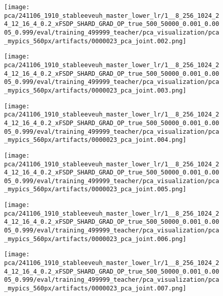 \begin{figure*}[p]
\begin{subfigure}[t]{0.097\textwidth}
    \end{subfigure}\hfill
    \begin{subfigure}[t]{0.097\textwidth}
        \centering
        \texttt{[image: pca/241106\_1910\_stableeveuh\_master\_lower\_lr/1\_\_8\_256\_1024\_24\_12\_16\_4\_0.2\_xFSDP\_SHARD\_GRAD\_OP\_true\_500\_50000\_0.001\_0.0005\_0.999/eval/training\_499999\_teacher/pca\_visualization/pca\_mypics\_560px/artifacts/0000023\_pca\_joint.002.png]}
    \end{subfigure}\hfill
    \begin{subfigure}[t]{0.097\textwidth}
        \centering
        \texttt{[image: pca/241106\_1910\_stableeveuh\_master\_lower\_lr/1\_\_8\_256\_1024\_24\_12\_16\_4\_0.2\_xFSDP\_SHARD\_GRAD\_OP\_true\_500\_50000\_0.001\_0.0005\_0.999/eval/training\_499999\_teacher/pca\_visualization/pca\_mypics\_560px/artifacts/0000023\_pca\_joint.003.png]}
    \end{subfigure}\hfill
    \begin{subfigure}[t]{0.097\textwidth}
        \centering
        \texttt{[image: pca/241106\_1910\_stableeveuh\_master\_lower\_lr/1\_\_8\_256\_1024\_24\_12\_16\_4\_0.2\_xFSDP\_SHARD\_GRAD\_OP\_true\_500\_50000\_0.001\_0.0005\_0.999/eval/training\_499999\_teacher/pca\_visualization/pca\_mypics\_560px/artifacts/0000023\_pca\_joint.004.png]}
    \end{subfigure}\hfill
    \begin{subfigure}[t]{0.097\textwidth}
        \centering
        \texttt{[image: pca/241106\_1910\_stableeveuh\_master\_lower\_lr/1\_\_8\_256\_1024\_24\_12\_16\_4\_0.2\_xFSDP\_SHARD\_GRAD\_OP\_true\_500\_50000\_0.001\_0.0005\_0.999/eval/training\_499999\_teacher/pca\_visualization/pca\_mypics\_560px/artifacts/0000023\_pca\_joint.005.png]}
    \end{subfigure}\hfill
    \begin{subfigure}[t]{0.097\textwidth}
        \centering
        \texttt{[image: pca/241106\_1910\_stableeveuh\_master\_lower\_lr/1\_\_8\_256\_1024\_24\_12\_16\_4\_0.2\_xFSDP\_SHARD\_GRAD\_OP\_true\_500\_50000\_0.001\_0.0005\_0.999/eval/training\_499999\_teacher/pca\_visualization/pca\_mypics\_560px/artifacts/0000023\_pca\_joint.006.png]}
    \end{subfigure}\hfill
    \begin{subfigure}[t]{0.097\textwidth}
        \centering
        \texttt{[image: pca/241106\_1910\_stableeveuh\_master\_lower\_lr/1\_\_8\_256\_1024\_24\_12\_16\_4\_0.2\_xFSDP\_SHARD\_GRAD\_OP\_true\_500\_50000\_0.001\_0.0005\_0.999/eval/training\_499999\_teacher/pca\_visualization/pca\_mypics\_560px/artifacts/0000023\_pca\_joint.007.png]}

\end{subfigure}
\end{figure*}
